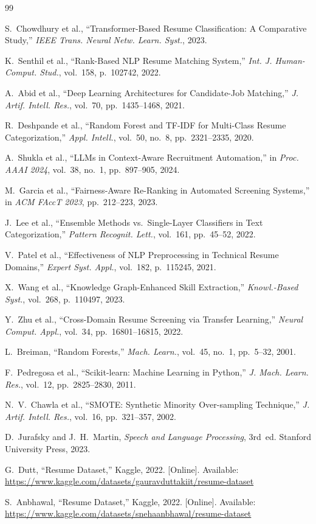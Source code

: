\documentclass[10pt,twocolumn]{article}
\begin{document}
\begin{thebibliography}{99}
\small

S.~Chowdhury et al., ``Transformer-Based Resume Classification: A Comparative Study,'' \textit{IEEE Trans. Neural Netw. Learn. Syst.}, 2023.

K.~Senthil et al., ``Rank-Based NLP Resume Matching System,'' \textit{Int. J. Human-Comput. Stud.}, vol.~158, p.~102742, 2022.

A.~Abid et al., ``Deep Learning Architectures for Candidate-Job Matching,'' \textit{J. Artif. Intell. Res.}, vol.~70, pp.~1435--1468, 2021.

R.~Deshpande et al., ``Random Forest and TF-IDF for Multi-Class Resume Categorization,'' \textit{Appl. Intell.}, vol.~50, no.~8, pp.~2321--2335, 2020.

A.~Shukla et al., ``LLMs in Context-Aware Recruitment Automation,'' in \textit{Proc. AAAI 2024}, vol.~38, no.~1, pp.~897--905, 2024.

M.~Garcia et al., ``Fairness-Aware Re-Ranking in Automated Screening Systems,'' in \textit{ACM FAccT 2023}, pp.~212--223, 2023.

J.~Lee et al., ``Ensemble Methods vs.\ Single-Layer Classifiers in Text Categorization,'' \textit{Pattern Recognit. Lett.}, vol.~161, pp.~45--52, 2022.

V.~Patel et al., ``Effectiveness of NLP Preprocessing in Technical Resume Domains,'' \textit{Expert Syst. Appl.}, vol.~182, p.~115245, 2021.

X.~Wang et al., ``Knowledge Graph-Enhanced Skill Extraction,'' \textit{Knowl.-Based Syst.}, vol.~268, p.~110497, 2023.

Y.~Zhu et al., ``Cross-Domain Resume Screening via Transfer Learning,'' \textit{Neural Comput. Appl.}, vol.~34, pp.~16801--16815, 2022.

L.~Breiman, ``Random Forests,'' \textit{Mach. Learn.}, vol.~45, no.~1, pp.~5--32, 2001.

F.~Pedregosa et al., ``Scikit-learn: Machine Learning in Python,'' \textit{J. Mach. Learn. Res.}, vol.~12, pp.~2825--2830, 2011.

N.~V.~Chawla et al., ``SMOTE: Synthetic Minority Over-sampling Technique,'' \textit{J. Artif. Intell. Res.}, vol.~16, pp.~321--357, 2002.

D.~Jurafsky and J.~H.~Martin, \textit{Speech and Language Processing}, 3rd~ed. Stanford University Press, 2023.

G.~Dutt, ``Resume Dataset,'' Kaggle, 2022. [Online]. Available: \url{https://www.kaggle.com/datasets/gauravduttakiit/resume-dataset}

S.~Anbhawal, ``Resume Dataset,'' Kaggle, 2022. [Online]. Available: \url{https://www.kaggle.com/datasets/snehaanbhawal/resume-dataset}

\end{thebibliography}
\end{document}
